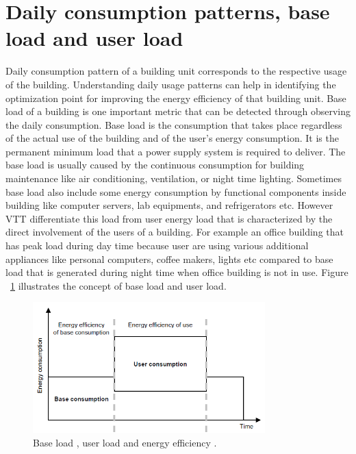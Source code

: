 \section{Daily consumption patterns, base load and user load}\label{daily}
Daily consumption pattern of a building unit corresponds to the respective usage of the building. Understanding daily usage patterns can help in identifying the optimization point for improving the energy efficiency of that building unit. Base load of a building is one important metric that can be detected through observing the daily consumption. Base load is the consumption that takes place regardless of the actual use of the building and of the user's energy consumption\cite{forsstrommeasuring}. It is the permanent minimum load that a power supply system is required to deliver. The base load is usually caused by the continuous consumption for building maintenance like air conditioning, ventilation, or night time lighting. Sometimes base load also include some energy consumption by functional components inside building like computer servers, lab equipments, and refrigerators etc. However VTT differentiate this load from user energy load that is characterized by the direct involvement of the users of a building. For example an office building that has peak load during day time because user  are using various additional appliances like personal computers, coffee makers, lights etc compared to base load that is generated during night time when office building is not in use. Figure  ~\ref{fig:baseload} illustrates the concept of base load and user load.
\begin{figure}[ht]
  \begin{center}
    \includegraphics[width=0.8\textwidth]{images/baseload.png}
    \caption{ Base load , user load and energy efficiency \cite{forsstrommeasuring}.}
    \label{fig:baseload}
  \end{center}
\end{figure}

